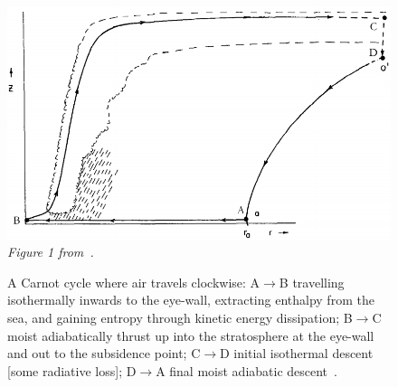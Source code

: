 \begin{figure}
\centering
    \includegraphics[width=\linewidth]{images/hurricane-carnot.png}\\
    \textit{Figure 1 from~\cite{emanuel1991theory}. }
    \caption{A Carnot cycle where air travels clockwise:
            A$\rightarrow$B travelling isothermally inwards to the eye-wall, extracting enthalpy
            from the sea, and gaining entropy through kinetic energy dissipation;
            B$\rightarrow$C moist adiabatically thrust up into the stratosphere
            at the eye-wall and out to the subsidence point;
            C$\rightarrow$D initial isothermal descent [some radiative loss];
            D$\rightarrow$A final moist adiabatic descent~\cite{emanuel2018progress}. }
            \label{fig:hurricane-carnot}

\end{figure}
